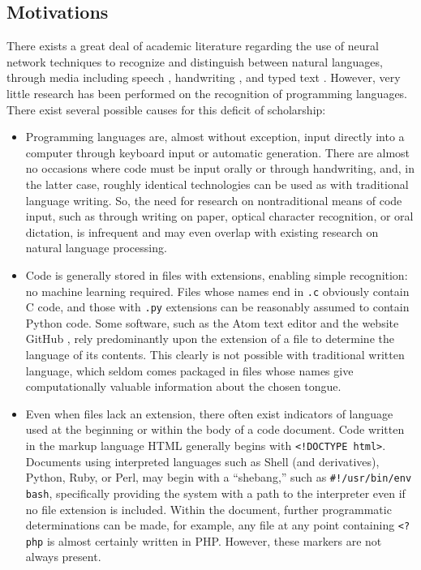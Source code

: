 \documentclass{article}
\begin{document}
\subsection{Motivations}
There exists a great deal of academic literature regarding the use of neural network techniques to recognize and distinguish between natural languages, through media including speech \cite{rnnspoken}\cite{dcrnnspoken}, handwriting \cite{handwritingex}, and typed text \cite{langidnn}\cite{langidstanford}. However, very little research has been performed on the recognition of programming languages. There exist several possible causes for this deficit of scholarship:
\begin{itemize}
    \item{Programming languages are, almost without exception, input directly into a computer through keyboard input or automatic generation. There are almost no occasions where code must be input orally or through handwriting, and, in the latter case, roughly identical technologies can be used as with traditional language writing. So, the need for research on nontraditional means of code input, such as through writing on paper, optical character recognition, or oral dictation, is infrequent and may even overlap with existing research on natural language processing.}
    \item{Code is generally stored in files with extensions, enabling simple recognition: no machine learning required. Files whose names end in \texttt{.c} obviously contain C code, and those with \texttt{.py} extensions can be reasonably assumed to contain Python code. Some software, such as the Atom text editor and the website GitHub \cite{githubid}, rely predominantly upon the extension of a file to determine the language of its contents. This clearly is not possible with traditional written language, which seldom comes packaged in files whose names give computationally valuable information about the chosen tongue.}
    \item{Even when files lack an extension, there often exist indicators of language used at the beginning or within the body of a code document. Code written in the markup language HTML generally begins with \texttt{<!DOCTYPE html>}. Documents using interpreted languages such as Shell (and derivatives), Python, Ruby, or Perl, may begin with a ``shebang,'' such as \texttt{#!/usr/bin/env bash}, specifically providing the system with a path to the interpreter even if no file extension is included. Within the document, further programmatic determinations can be made, for example, any file at any point containing \texttt{<?php} is almost certainly written in PHP. However, these markers are not always present.}
\end{itemize}
\end{document}
